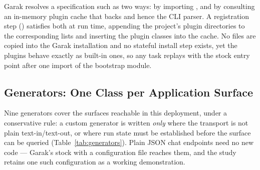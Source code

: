 Garak resolves a specification such as
 two ways: by importing
, and by consulting an in-memory plugin
cache that backs  and hence the CLI parser.
A registration step () satisfies
both at run time, appending the project's plugin directories to the
corresponding
 lists
and inserting the plugin classes into the cache. No files are copied
into the Garak installation and no stateful install step exists, yet
the plugins behave exactly as built-in ones, so any task replays with
the stock entry point after one import of the bootstrap module.

\subsection{Generators: One Class per Application Surface}
\label{sec:arch:generators}

Nine generators cover the surfaces reachable in this deployment, under
a conservative rule: a custom generator is written \emph{only} where
the transport is not plain text-in/text-out, or where run state must be
established before the surface can be queried
(Table~\ref{tab:generators}). Plain JSON chat endpoints need no new
code --- Garak's stock  with a configuration file
reaches them, and the study retains one such configuration as a working
demonstration.

